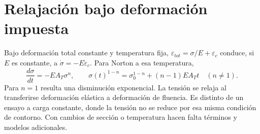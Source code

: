 \section{Relajación bajo deformación impuesta}
Bajo deformación total constante y temperatura fija, $\varepsilon_{tot}=\sigma/E+\varepsilon_c$ conduce, si $E$ es constante, a $\dot\sigma=-E\dot\varepsilon_c$. Para Norton a esa temperatura,
\begin{equation}\frac{d\sigma}{dt}=-EA_T\sigma^n,\qquad \sigma(t)^{1-n}=\sigma_0^{1-n}+(n-1)EA_Tt\quad(n\ne1).\end{equation}
Para $n=1$ resulta una disminución exponencial. La tensión se relaja al transferirse deformación elástica a deformación de fluencia. Es distinto de un ensayo a carga constante, donde la tensión no se reduce por esa misma condición de contorno. Con cambios de sección o temperatura hacen falta términos y modelos adicionales.
